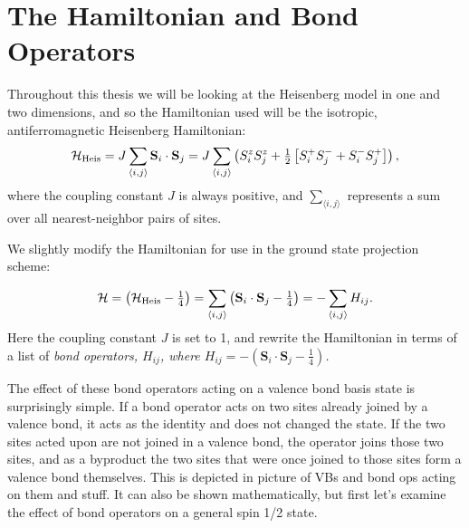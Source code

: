 \section{The Hamiltonian and Bond Operators}
Throughout this thesis we will be looking at the Heisenberg model in one and two dimensions,
and so the Hamiltonian used will be the isotropic, antiferromagnetic Heisenberg 
Hamiltonian:
\begin{equation}
\mathcal{H}_{\rm{Heis}}=J\sum_{\langle i,j \rangle} \mathbf{S}_i\cdot \mathbf{S}_j
= J\sum_{\langle i,j \rangle}
	\left( S_i^z S_j^z + \tfrac{1}{2}\left[ S_i^+ S_j^- + S_i^- S_j^+ \right]\right),
\end{equation}
where the coupling constant $J$ is always positive, and $\sum_{\langle i,j \rangle}$ 
represents a sum over all nearest-neighbor pairs of sites.  

We slightly modify the Hamiltonian for use in the ground state projection scheme:

\begin{equation}
\mathcal{H}= \left(\mathcal{H}_{\rm{Heis}} - \tfrac{1}{4} \right)= \sum_{\langle i,j \rangle} 
	\left(\mathbf{S}_i\cdot \mathbf{S}_j - \tfrac{1}{4}\right)
	= - \sum_{\langle i,j \rangle} H_{ij}.
\end{equation}
Here the coupling constant $J$ is set to 1, and rewrite the Hamiltonian in terms of a list of
\it{bond operators}, \rm $H_{ij}$, where 
$H_{ij}=-\left(\mathbf{S}_i\cdot \mathbf{S}_j - \tfrac{1}{4}\right)$.

The effect of these bond operators acting on a valence bond basis state is 
surprisingly simple.  If a bond operator acts on two sites already joined by a valence
bond, it acts as the identity and does not changed the state.  If the two sites acted upon are 
not joined in a valence bond, the operator joins those two sites, and as a byproduct the 
two sites that were once joined to those sites form a valence bond themselves.
This is depicted in {\color{red} picture of VBs and bond ops acting on them and stuff.}
It can also be shown mathematically, but first let's examine the effect of bond operators
on a general spin 1/2 state.

